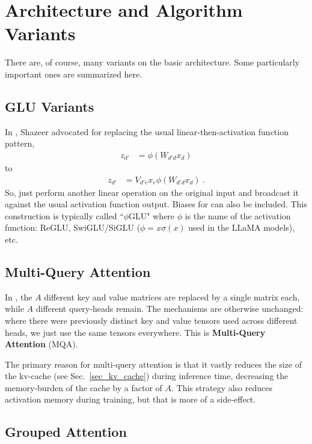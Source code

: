 \section{Architecture and Algorithm Variants}

There are, of course, many variants on the basic architecture. Some particularly important ones are
summarized here.

\subsection{GLU Variants\label{subsec_glu_variants}}

In \cite{shazeer2020gluvariantsimprovetransformer}, Shazeer advocated for replacing the usual
linear-then-activation function pattern,
\begin{align}
    z _{ d' } &= \phi \left  ( W _{ d' d } x _{ d } \right  )
\end{align}
to
\begin{align}
    z _{ d' } &=V _{ d'e }x _{ e } \phi \left ( W _{ d' d } x _{ d } \right  ) \ .
\end{align}
So, just perform another linear operation on the original input and broadcast it against the usual
activation function output. Biases for can also be included. This construction is typically called
``$ \phi $GLU" where $ \phi $ is the name of the activation function: ReGLU, SwiGLU/SiGLU ($ \phi=x
\sigma(x) $ used in the LLaMA models), etc.

\subsection{Multi-Query Attention \label{subsec_multi_query_attn}}

In \cite{shazeer2019fast}, the $ A $ different key and value matrices are replaced by a single
matrix each, while $ A$ different query-heads remain. The mechanisms are otherwise unchanged: where
there were previously distinct key and value tensors used across different heads, we just use the same
tensors everywhere. This is \textbf{Multi-Query Attention} (MQA).


The primary reason for multi-query attention is that it vastly reduces the size of the kv-cache (see
Sec.~\ref{sec_kv_cache}) during inference time, decreasing the memory-burden of the cache by a
factor of $ A $. This strategy also reduces activation memory during training, but that is more of a
side-effect.

\subsection{Grouped Attention \label{subsec_grouped_attn}}

